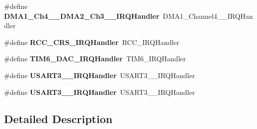 \begin{DoxyCompactItemize}
\item 
\mbox{\label{group__stm32f070xb_ga035f9aa47c046222541cca70e281b415}} 
\#define {\bfseries D\+M\+A1\+\_\+\+Ch4\+\_\+\_\+\+D\+M\+A2\+\_\+\+Ch3\+\_\+\_\+\+I\+R\+Q\+Handler}~D\+M\+A1\+\_\+\+Channel4\+\_\+\_\+\+I\+R\+Q\+Handler
\item 
\mbox{\label{group__stm32f070xb_ga82a9eac30db2cc914975bc71ce5fcb92}} 
\#define {\bfseries R\+C\+C\+\_\+\+C\+R\+S\+\_\+\+I\+R\+Q\+Handler}~R\+C\+C\+\_\+\+I\+R\+Q\+Handler
\item 
\mbox{\label{group__stm32f070xb_ga7d58a944f63161f2152026eedc430848}} 
\#define {\bfseries T\+I\+M6\+\_\+\+D\+A\+C\+\_\+\+I\+R\+Q\+Handler}~T\+I\+M6\+\_\+\+I\+R\+Q\+Handler
\item 
\mbox{\label{group__stm32f070xb_gaf04189172ff710986cd652a06e6f3f69}} 
\#define {\bfseries U\+S\+A\+R\+T3\+\_\+\_\+\+I\+R\+Q\+Handler}~U\+S\+A\+R\+T3\+\_\+\_\+\+I\+R\+Q\+Handler
\item 
\mbox{\label{group__stm32f070xb_ga36a6fa2533fdea503ca6341545d3148e}} 
\#define {\bfseries U\+S\+A\+R\+T3\+\_\+\_\+\+I\+R\+Q\+Handler}~U\+S\+A\+R\+T3\+\_\+\_\+\+I\+R\+Q\+Handler
\end{DoxyCompactItemize}


\subsection{Detailed Description}
